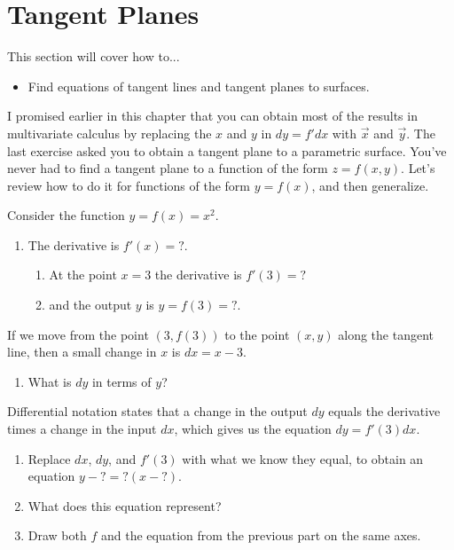 


\section{Tangent Planes}
This section will cover how to...
\begin{itemize} 
\item Find equations of tangent lines and tangent planes to surfaces. 
\end{itemize}


I promised earlier in this chapter that you can obtain most of the results in multivariate calculus by replacing the $x$ and $y$ in $dy=f'dx$ with $\vec x$ and $\vec y$. The last exercise asked you to obtain a tangent plane to a parametric surface. You've never had to find a tangent plane to a function of the form $z=f(x,y)$.  Let's review how to do it for functions of the form $y=f(x)$, and then generalize. 

\begin{problem}\label{prob:tangent line1}
 Consider the function $y=f(x)=x^2$.  
\begin{enumerate}
 \item The derivative is $f'(x) = ?$. 
	\begin{enumerate} 
		\item At the point $x=3$ the derivative is $f'(3)=?$ 
		\item and the output $y$ is $y=f(3)=?$.
	\end{enumerate}
\end{enumerate}
If we move from the point $(3,f(3))$ to the point $(x,y)$ along the tangent line, then a small change in $x$ is $dx=x-3$. 
\begin{enumerate}[resume]
	\item What is $dy$ in terms of $y$?
\end{enumerate}
Differential notation states that a change in the output $dy$ equals the derivative times a change in the input $dx$, which gives us the equation $dy=f'(3)dx$. 
\begin{enumerate}[resume]
	\item Replace $dx$, $dy$, and $f'(3)$ with what we know they equal, to obtain an equation $y-?=?(x-?)$. 
	\item What does this equation represent?
	\item Draw both $f$ and the equation from the previous part on the same axes.   
\end{enumerate}
\end{problem}

